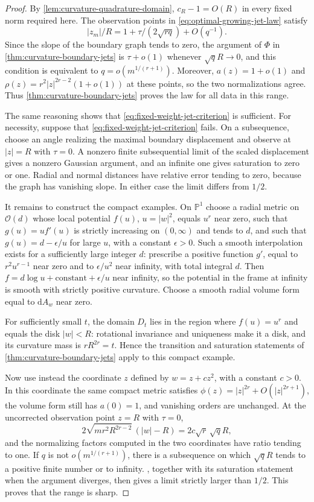 \begin{proof}
By \cref{lem:curvature-quadrature-domain}, $c_R-1=O(R)$ in every fixed norm required here. The observation points in \eqref{eq:optimal-growing-jet-law} satisfy
\[
 |z_m|/R=1+\tau/(2\sqrt{rq})+O(q^{-1}).
\]
Since the slope of the boundary graph tends to zero, the argument of $\Phi$ in \cref{thm:curvature-boundary-jets} is $\tau+o(1)$ whenever $\sqrt q R\to0$, and this condition is equivalent to
$q=o(m^{1/(r+1)})$. Moreover, $a(z)=1+o(1)$ and
$\rho(z)=r^2|z|^{2r-2}(1+o(1))$ at these points, so the two normalizations agree. Thus \cref{thm:curvature-boundary-jets} proves the law for all data in this range.

The same reasoning shows that \eqref{eq:fixed-weight-jet-criterion} is sufficient. For necessity, suppose that \eqref{eq:fixed-weight-jet-criterion} fails. On a subsequence, choose an angle realizing the maximal boundary displacement and observe at $|z|=R$ with $\tau=0$. A nonzero finite subsequential limit of the scaled displacement gives a nonzero Gaussian argument, and an infinite one gives saturation to zero or one. Radial and normal distances have relative error tending to zero, because the graph has vanishing slope. In either case the limit differs from $1/2$.

It remains to construct the compact examples. On $\mathbb P^1$ choose a radial metric on $\mathcal O(d)$ whose local potential $f(u)$, $u=|w|^2$, equals $u^r$ near zero, such that
$g(u)=uf'(u)$ is strictly increasing on $(0,\infty)$ and tends to $d$, and such that
$g(u)=d-\epsilon/u$ for large $u$, with a constant $\epsilon>0$.
Such a smooth interpolation exists for a sufficiently large integer
$d$: prescribe a positive function $g'$, equal to $r^2u^{r-1}$ near zero and to
$\epsilon/u^2$ near infinity, with total integral $d$.
Then $f=d\log u+\mathrm{constant}+\epsilon/u$ near infinity, so the potential in the frame at infinity is smooth with strictly positive curvature. Choose a smooth radial volume form equal to $\mathrm{d}A_w$ near zero.

For sufficiently small $t$, the domain $D_t$ lies in the region where $f(u)=u^r$ and equals the disk $|w|<R$: rotational invariance and uniqueness make it a disk, and its curvature mass is $rR^{2r}=t$. Hence the transition and saturation statements of \cref{thm:curvature-boundary-jets} apply to this compact example.

Now use instead the coordinate $z$ defined by $w=z+cz^2$, with a constant $c>0$. In this coordinate the same compact metric satisfies
$\phi(z)=|z|^{2r}+O(|z|^{2r+1})$, the volume form still has $a(0)=1$, and vanishing orders are unchanged. At the uncorrected observation point $z=R$ with $\tau=0$,
\[
 2\sqrt{mr^2R^{2r-2}}\,(|w|-R)
 =2c\sqrt r\,\sqrt q R,
\]
and the normalizing factors computed in the two coordinates have ratio tending to one. If $q$ is not $o(m^{1/(r+1)})$, there is a subsequence on which $\sqrt q R$ tends to a positive finite number or to infinity. , together with its saturation statement when the argument diverges, then gives a limit strictly larger than $1/2$. This proves that the range is sharp.
\end{proof}

